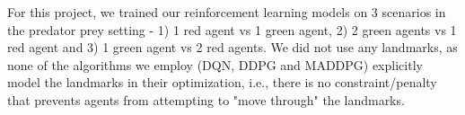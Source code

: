 For this project, we trained our reinforcement learning models on 3 scenarios in the predator prey setting - 1) 1 red agent vs 1 green agent, 2) 2 green agents vs 1 red agent and 3) 1 green agent vs 2 red agents. We did not use any landmarks, as none of the algorithms we employ (DQN, DDPG and MADDPG) explicitly model the landmarks in their optimization, i.e., there is no constraint/penalty that prevents agents from attempting to "move through" the landmarks. 

